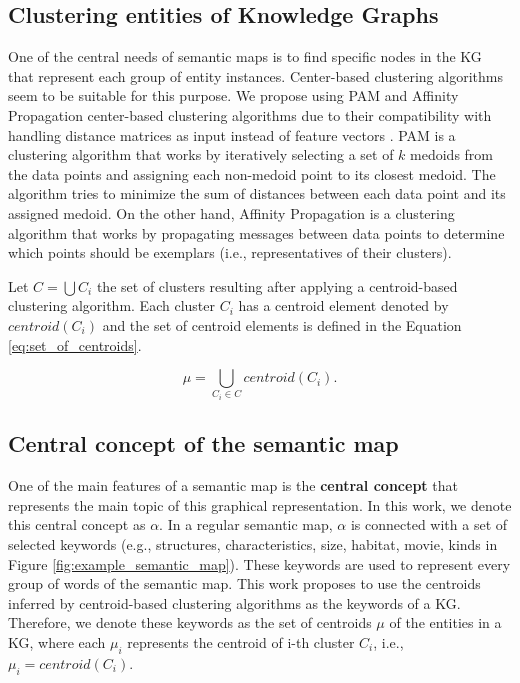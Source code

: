 \documentclass{ieeeaccess}
\begin{document}
\subsection{Clustering entities of Knowledge Graphs}

One of the central needs of semantic maps is
to find specific nodes in the KG that represent
each group of entity instances. Center-based 
clustering algorithms seem to be suitable for
this purpose.
We propose using PAM and Affinity Propagation 
center-based clustering algorithms due to their 
compatibility with handling distance matrices 
as input instead of feature vectors \cite{kaufmanPAM,
frey2007clustering}. PAM is a clustering algorithm
that works by iteratively selecting a set of 
$k$ medoids from the data points and assigning 
each non-medoid point to
its closest medoid. The algorithm tries to minimize
the sum of distances between each data point and
its assigned medoid. On the other hand, Affinity 
Propagation is a clustering algorithm that works 
by propagating messages between data points to 
determine which points should be exemplars
(i.e., representatives of their clusters). 

Let $C = \bigcup C_{i}$ the set of clusters 
resulting after applying a centroid-based clustering
algorithm. Each cluster $C_{i}$ has a centroid element
denoted by $centroid(C_{i})$ and the set of centroid
elements is defined in the Equation \ref{eq:set_of_centroids}.

\begin{equation}
    \label{eq:set_of_centroids}
   \mu = \bigcup_{C_{i} \in C} centroid(C_{i}). 
\end{equation}

\subsection{Central concept of the semantic map}

One of the main features of a semantic map is the
\textbf{central concept} that represents the main 
topic of this graphical representation. In this work,
we denote this central concept as $\alpha$. In a 
regular semantic map, $\alpha$ is connected with
a set of selected keywords (e.g., {structures,
characteristics, size, habitat, movie, kinds} in 
Figure \ref{fig:example_semantic_map}). These 
keywords are used to represent every group of 
words of the semantic map. This work proposes to
use the centroids inferred by centroid-based clustering 
algorithms \cite{Dongkuan2015} as the keywords
of a KG. Therefore, we denote these keywords as
the set of centroids $\mu$ of the entities in a KG,
where each $\mu_{i}$ represents the centroid of
i-th cluster $C_{i}$, i.e., 
$\mu_{i} = centroid(C_{i})$.
\end{document}
